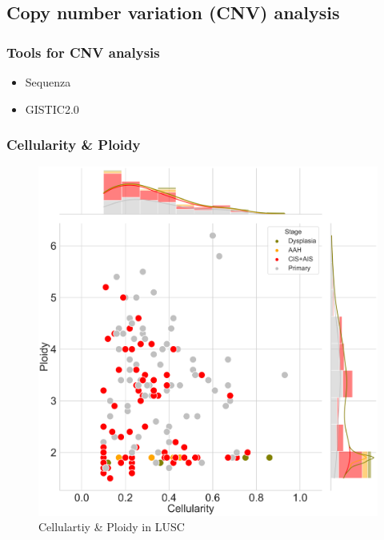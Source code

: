 \documentclass{beamer}
\begin{document}
        \subsection{Copy number variation (CNV) analysis}
            \begin{frame}
                \frametitle{Tools for CNV analysis}

                \begin{itemize}
                    \item Sequenza \cite{sequenza-01}
                    \item GISTIC2.0 \cite{gistic-01}
                \end{itemize}
            \end{frame}

            \begin{frame}
                \frametitle{Cellularity \& Ploidy}

                \begin{figure}
                    \includegraphics[width=0.4 \linewidth]{figures/Sequenza/BWA-sequenza-SQC.pdf}
                    \caption{Cellulartiy \& Ploidy in LUSC}
                \end{figure}
            \end{frame}
\end{document}
